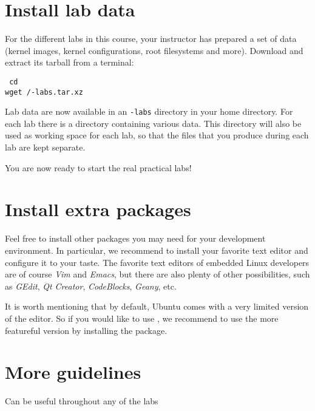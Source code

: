 
\section{Install lab data}

For the different labs in this course, your instructor has prepared a
set of data (kernel images, kernel configurations, root filesystems
and more). Download and extract its tarball from a terminal:


{\scriptsize
{\tt
cd \\
wget \sessionurl/\longname-labs.tar.xz \\
}
}

Lab data are now available in an {\tt \longname-labs} directory in
your home directory. For each lab there is a directory containing
various data. This directory will also be used as working space for
each lab, so that the files that you produce during each lab are kept
separate.

You are now ready to start the real practical labs!

\section{Install extra packages}

Feel free to install other packages you may need for your development
environment. In particular, we recommend to install your favorite text
editor and configure it to your taste. The favorite text editors of
embedded Linux developers are of course {\em Vim} and {\em Emacs}, but
there are also plenty of other possibilities, such as {\em GEdit},
{\em Qt Creator}, {\em CodeBlocks}, {\em Geany}, etc.

It is worth mentioning that by default, Ubuntu comes with a very
limited version of the  editor. So if you would like to use
, we recommend to use the more featureful version by
installing the  package.

\section{More guidelines}

Can be useful throughout any of the labs

